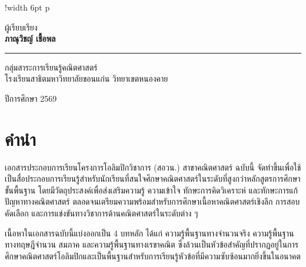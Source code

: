 \documentclass[a4paper,oneside,12pt]{book}
\begin{document}
\begin{titlepage}
\begin{minipage}{0.88\textwidth}
\begin{tabular}{!{\color{coverblue}\vrule width 6pt}
				p{\dimexpr\textwidth-30pt}}
{\begin{minipage}[t]{\dimexpr\textwidth-30pt}
					\vspace{24pt}
				\end{minipage}
			}
		\end{tabular}
	\end{minipage}
	
	\vfill
	
	\begin{minipage}{0.8\textwidth}
		\centering
		
		{\large ผู้เรียบเรียง}\\[0.45cm]
		
		{\huge\bfseries ภาณุวิชญ์ เชื้อพล}\\[0.4cm]
		
		\color{coverblue}
		\rule{0.60\textwidth}{1.2pt}
		
		\vspace{0.45cm}
		
		{\large กลุ่มสาระการเรียนรู้คณิตศาสตร์}\\[0.15cm]
		{\large โรงเรียนสาธิตมหาวิทยาลัยขอนแก่น วิทยาเขตหนองคาย}
	\end{minipage}
	
	\vfill
	
	{\large ปีการศึกษา 2569}
	
	\vspace*{0.8cm}
	
\end{titlepage}

\newpage
\thispagestyle{empty} %
\newpage

\chapter*{คำนำ}

เอกสารประกอบการเรียนโครงการโอลิมปิกวิชาการ (สอวน.) สาขาคณิตศาสตร์ ฉบับนี้ จัดทำขึ้นเพื่อใช้เป็นสื่อประกอบการเรียนรู้สำหรับนักเรียนที่สนใจศึกษาคณิตศาสตร์ในระดับที่สูงกว่าหลักสูตรการศึกษาขั้นพื้นฐาน โดยมีวัตถุประสงค์เพื่อส่งเสริมความรู้ ความเข้าใจ ทักษะการคิดวิเคราะห์ และทักษะการแก้ปัญหาทางคณิตศาสตร์ ตลอดจนเตรียมความพร้อมสำหรับการศึกษาเนื้อหาคณิตศาสตร์เชิงลึก การสอบคัดเลือก และการแข่งขันทางวิชาการด้านคณิตศาสตร์ในระดับต่าง ๆ

เนื้อหาในเอกสารฉบับนี้แบ่งออกเป็น 4 บทหลัก ได้แก่ ความรู้พื้นฐานทางจำนวนจริง ความรู้พื้นฐานทางทฤษฎีจำนวน สมภาค และความรู้พื้นฐานทางเรขาคณิต ซึ่งล้วนเป็นหัวข้อสำคัญที่ปรากฏอยู่ในการศึกษาคณิตศาสตร์โอลิมปิกและเป็นพื้นฐานสำหรับการเรียนรู้หัวข้อที่มีความซับซ้อนมากยิ่งขึ้นในอนาคต
\end{document}

